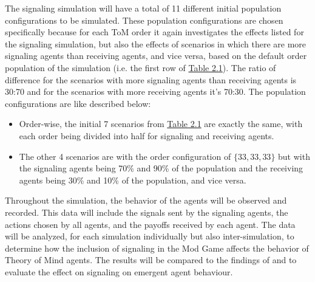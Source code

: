 The signaling simulation will have a total of 11 different initial population configurations to be simulated. These population configurations are chosen specifically because for each ToM order it again investigates the effects listed for the signaling simulation, but also the effects of scenarios in which there are more signaling agents than receiving agents, and vice versa, based on the default order population of the simulation (i.e. the first row of \hyperref[tab:reg-population-table]{Table 2.1}). The ratio of difference for the scenarios with more signaling agents than receiving agents is 30:70 and for the scenarios with more receiving agents it's 70:30. The population configurations are like described below:

\begin{itemize}
    \item Order-wise, the initial 7 scenarios from \hyperref[tab:reg-population-table]{Table 2.1} are exactly the same, with each order being divided into half for signaling and receiving agents.
    \item The other 4 scenarios are with the order configuration of $\{33,33,33\}$ but with the signaling agents being 70\% and 90\% of the population and the receiving agents being 30\% and 10\% of the population, and vice versa.
\end{itemize}


Throughout the simulation, the behavior of the agents will be observed and recorded. This data will include the signals sent by the signaling agents, the actions chosen by all agents, and the payoffs received by each agent. The data will be analyzed, for each simulation individually but also inter-simulation, to determine how the inclusion of signaling in the Mod Game affects the behavior of Theory of Mind agents. The results will be compared to the findings of \cite{de2013much} and \cite{veltman2019training} to evaluate the effect on signaling on emergent agent behaviour.
